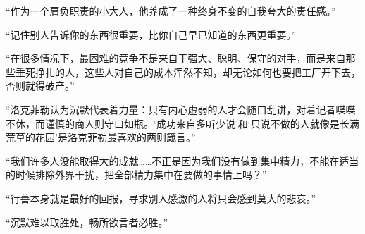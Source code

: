 “作为一个肩负职责的小大人，他养成了一种终身不变的自我夸大的责任感。”
\par

“记住别人告诉你的东西很重要，比你自己早已知道的东西更重要。”
\par

“在很多情况下，最困难的竞争不是来自于强大、聪明、保守的对手，而是来自那些垂死挣扎的人，这些人对自己的成本浑然不知，却无论如何也要把工厂开下去，否则就得破产。”
\par

“洛克菲勒认为沉默代表着力量：只有内心虚弱的人才会随口乱讲，对着记者喋喋不休，而谨慎的商人则守口如瓶。‘成功来自多听少说’和‘只说不做的人就像是长满荒草的花园’是洛克菲勒最喜欢的两则箴言。”
\par

“我们许多人没能取得大的成就……不正是因为我们没有做到集中精力，不能在适当的时候排除外界干扰，把全部精力集中在要做的事情上吗？”
\par

“行善本身就是最好的回报，寻求别人感激的人将只会感到莫大的悲哀。”
\par

“沉默难以取胜处，畅所欲言者必胜。”
\par
